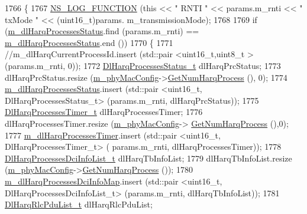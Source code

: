 \begin{DoxyCode}
1766 \{
1767   \hyperlink{log-macros-disabled_8h_a90b90d5bad1f39cb1b64923ea94c0761}{NS\_LOG\_FUNCTION} (\textcolor{keyword}{this} << \textcolor{stringliteral}{" RNTI "} << params.m\_rnti << \textcolor{stringliteral}{" txMode "} << (uint16\_t)params.
      m\_transmissionMode);
1768 
1769   \textcolor{keywordflow}{if} (\hyperlink{classns3_1_1MmWaveFlexTtiMacScheduler_a7ea48669590368853d16240acf7dbebe}{m\_dlHarqProcessesStatus}.find (params.m\_rnti) == 
      \hyperlink{classns3_1_1MmWaveFlexTtiMacScheduler_a7ea48669590368853d16240acf7dbebe}{m\_dlHarqProcessesStatus}.end ())
1770   \{
1771         \textcolor{comment}{//m\_dlHarqCurrentProcessId.insert (std::pair <uint16\_t,uint8\_t > (params.m\_rnti, 0));}
1772         \hyperlink{classns3_1_1MmWaveFlexTtiMacScheduler_afdca7f52a7350da97088138d59473f9a}{DlHarqProcessesStatus\_t} dlHarqPrcStatus;
1773         dlHarqPrcStatus.resize (\hyperlink{classns3_1_1MmWaveMacScheduler_a24d7af4971d2e500fe543cefbafa2fd9}{m\_phyMacConfig}->\hyperlink{classns3_1_1MmWavePhyMacCommon_a40773d84172ebeb5aff125f56ebcc5ac}{GetNumHarqProcess} (), 0);
1774         \hyperlink{classns3_1_1MmWaveFlexTtiMacScheduler_a7ea48669590368853d16240acf7dbebe}{m\_dlHarqProcessesStatus}.insert (std::pair <uint16\_t,
       DlHarqProcessesStatus\_t> (params.m\_rnti, dlHarqPrcStatus));
1775         \hyperlink{classns3_1_1MmWaveFlexTtiMacScheduler_a88d19a5582694a885d76e6abde60691b}{DlHarqProcessesTimer\_t} dlHarqProcessesTimer;
1776         dlHarqProcessesTimer.resize (\hyperlink{classns3_1_1MmWaveMacScheduler_a24d7af4971d2e500fe543cefbafa2fd9}{m\_phyMacConfig}->
      \hyperlink{classns3_1_1MmWavePhyMacCommon_a40773d84172ebeb5aff125f56ebcc5ac}{GetNumHarqProcess} (),0);
1777         \hyperlink{classns3_1_1MmWaveFlexTtiMacScheduler_a321e6f7863545e750acf6e94855514c5}{m\_dlHarqProcessesTimer}.insert (std::pair <uint16\_t, DlHarqProcessesTimer\_t> (
      params.m\_rnti, dlHarqProcessesTimer));
1778         \hyperlink{classns3_1_1MmWaveFlexTtiMacScheduler_a0f9a8851fce0c15b30cbbb0a6afe6a93}{DlHarqProcessesDciInfoList\_t} dlHarqTbInfoList;
1779         dlHarqTbInfoList.resize (\hyperlink{classns3_1_1MmWaveMacScheduler_a24d7af4971d2e500fe543cefbafa2fd9}{m\_phyMacConfig}->\hyperlink{classns3_1_1MmWavePhyMacCommon_a40773d84172ebeb5aff125f56ebcc5ac}{GetNumHarqProcess} ());
1780         \hyperlink{classns3_1_1MmWaveFlexTtiMacScheduler_a2820fea8cd85e2351bc0b046bdfb8414}{m\_dlHarqProcessesDciInfoMap}.insert (std::pair <uint16\_t,
       DlHarqProcessesDciInfoList\_t> (params.m\_rnti, dlHarqTbInfoList));
1781         \hyperlink{classns3_1_1MmWaveFlexTtiMacScheduler_ad9f4f50bc7aba7e6471b03b6904888b4}{DlHarqRlcPduList\_t} dlHarqRlcPduList;

\end{DoxyCode}
